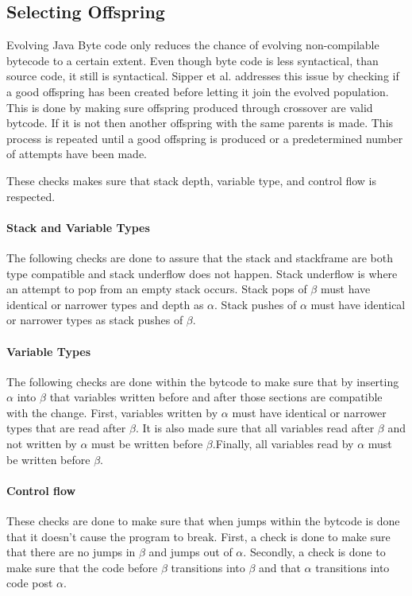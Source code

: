 \documentclass{sig-alternate}
\begin{document}
\subsection{Selecting Offspring}
Evolving Java Byte code only reduces the chance of evolving non-compilable bytecode to a certain extent. Even though byte code is less syntactical, than source code, it still is syntactical. Sipper et al.\cite{FINCH2:2009} addresses this issue by checking if a good offspring has been created before letting it join the evolved population. This is done by making sure offspring produced through crossover are valid bytcode. If it is not then another offspring with the same parents is made. This process is repeated until a good offspring is produced or a predetermined number of attempts have been made.\par
These checks makes sure that stack depth, variable type, and control flow is respected.

\paragraph{Stack and Variable Types}
The following checks are done to assure that the stack and stackframe are both type compatible and stack underflow does not happen. Stack underflow is where an attempt to pop from an empty stack occurs. Stack pops of $\beta$ must have identical or narrower types and depth as $\alpha$. Stack pushes of $\alpha$ must have identical or narrower types as stack pushes of $\beta$.

\paragraph{Variable Types}
The following checks are done within the bytcode to make sure that by inserting $\alpha$ into $\beta$ that variables written before and after those sections are compatible with the change. 
First, variables written by $\alpha$ must have identical or narrower types that are read after $\beta$. It is also made sure that all variables read after $\beta$ and not written by $\alpha$ must be written before $\beta$.Finally, all variables read by $\alpha$ must be written before $\beta$.

\paragraph{Control flow}
These checks are done to make sure that when jumps within the bytcode is done that it doesn't cause the program to break. First, a check is done to make sure that there are no jumps in $\beta$ and jumps out of $\alpha$. Secondly, a check is done to make sure that the code before $\beta$ transitions into $\beta$ and that $\alpha$ transitions into code post $\alpha$.  
\end{document}
